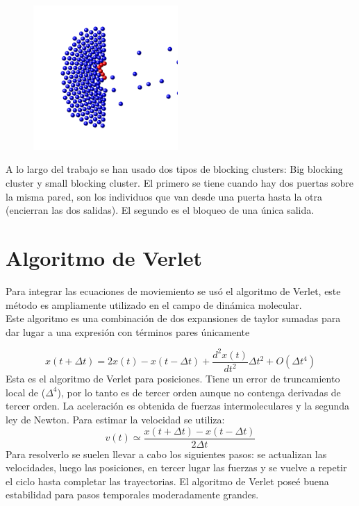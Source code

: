 \begin{figure}[H]
    \centering
    \includegraphics[height=5.5cm]{figuras/in_image_2_120000_bkg.png}
    \caption[width=5cm]{}
    \label{bc}
\end{figure}

A lo largo del trabajo se han usado dos tipos de blocking clusters: Big blocking cluster y small blocking cluster. El primero se tiene cuando hay dos puertas sobre la misma pared, son los individuos que van desde una puerta hasta la otra (encierran las dos salidas). El segundo es el bloqueo de una única salida. 

\section{Algoritmo de Verlet}

Para integrar las ecuaciones de moviemiento se usó el algoritmo de Verlet, este método es ampliamente utilizado en el campo de dinámica molecular.\\
Este algoritmo es una combinación de dos expansiones de taylor sumadas para dar lugar a una expresión con términos pares únicamente~\cite{haile}

\begin{equation}
x(t+\Delta t)=2x(t)-x(t-\Delta t)+\frac{d^2x(t)}{dt^2} \Delta t^2+O(\Delta t^4)
\label{verlet_x}
\end{equation} 
Esta es el algoritmo de Verlet para posiciones. Tiene un error de truncamiento local de ($\Delta^4$), por lo tanto es de tercer orden aunque no contenga derivadas de tercer orden. La aceleración es obtenida de fuerzas intermoleculares y la segunda ley de Newton.
Para estimar la velocidad se utiliza:
\begin{equation}
v(t)\simeq \frac{x(t+\Delta t)-x(t-\Delta t)}{2\Delta t}
\label{verlet_v}
\end{equation}
Para resolverlo se suelen llevar a cabo los siguientes pasos: se actualizan las velocidades, luego las posiciones, en tercer lugar las fuerzas y se vuelve a repetir el ciclo hasta completar las trayectorias. 
El algoritmo de Verlet poseé buena estabilidad para pasos temporales moderadamente grandes.
